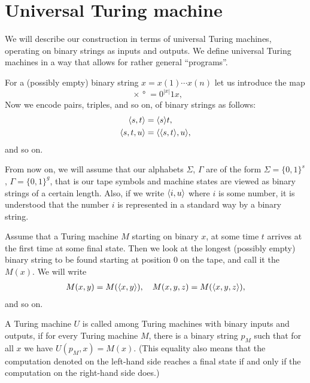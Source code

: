 \documentclass[12pt]{memoir}
\begin{document}
\section{Universal Turing machine}\label{sec:UTM}

We will describe our construction in terms of
universal Turing machines,
operating on binary strings as inputs and outputs.
We define universal Turing machines in a way that allows
for rather general ``programs''.

 \begin{definition}
For a (possibly empty) binary string \( x=x(1)\dotsm x(n) \) let us introduce the map
 \[
   \ang{x} = 0^{|x|}1 x,
 \]
Now we encode pairs, triples, and so on, of binary strings as follows:
 \begin{align*}
        {\mathopen\langle s,t\mathclose\rangle} &={\mathopen\langle s\mathclose\rangle}t,
\\ {\mathopen\langle s,t,u\mathclose\rangle} &= {\mathopen\langle {\mathopen\langle s,t\mathclose\rangle},u\mathclose\rangle},
 \end{align*}
and so on.

From now on, we will assume that our alphabets \( \Sigma \), \( \Gamma \)
are of the form \( \Sigma=\{0,1\}^{s} \), \( \Gamma=\{0,1\}^{g} \), that is 
our tape symbols and machine states are viewed as binary strings of a certain length.
Also, if we write \( {\mathopen\langle i,u\mathclose\rangle} \) where \( i \) is some number, it is understood
that the number \( i \) is represented in a standard way by a binary string.
\end{definition}

\begin{definition}
 Assume that a Turing machine \( M \) starting on binary \( x \),
 at some time \( t \)
 arrives at the first time at some final state.
 Then we look at the longest (possibly empty)
 binary string to be found starting at position
 0 on the tape, and call it the  \( M(x) \).
We will write
 \begin{align*}
   M(x,y)=M({\mathopen\langle x,y\mathclose\rangle}),\quad M(x,y,z)=M({\mathopen\langle x,y,z\mathclose\rangle}),
 \end{align*}
and so on.

A Turing machine \( U \) is called  
among Turing machines with
binary inputs and outputs, if for every Turing machine \( M \),
there is a binary string \( p_{M} \) such that for all \( x \) we have
\( U(p_{M},x)=M(x) \).
(This equality also means that the computation denoted on the left-hand side 
reaches a final state if and only if the computation on the right-hand side does.)
\end{definition}
\end{document}
